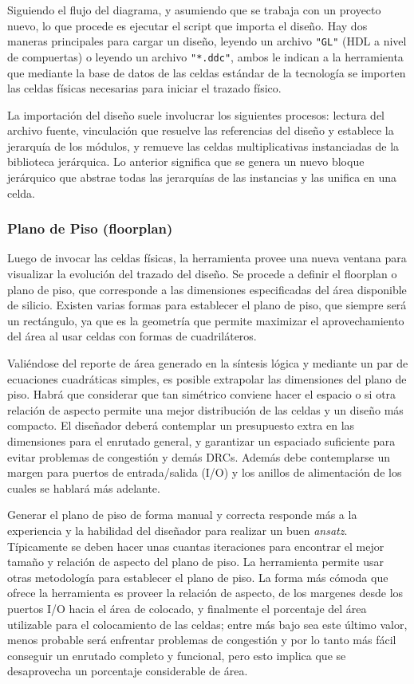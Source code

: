 Siguiendo el flujo del diagrama, y asumiendo que se trabaja con un proyecto nuevo, lo que procede es ejecutar el script que importa el diseño. Hay dos maneras principales para cargar un diseño, leyendo un archivo \texttt{"GL"} (HDL a nivel de compuertas) o leyendo un archivo \texttt{"*.ddc"}, ambos le indican a la herramienta que mediante la base de datos de las celdas estándar de la tecnología se importen las celdas físicas necesarias para iniciar el trazado físico.

La importación del diseño suele involucrar los siguientes procesos: lectura del archivo fuente, vinculación que resuelve las referencias del diseño y establece la jerarquía de los módulos, y remueve las celdas multiplicativas instanciadas de la biblioteca jerárquica. Lo anterior significa que se genera un nuevo bloque jerárquico que abstrae todas las jerarquías de las instancias y las unifica en una celda.

\subsubsection{Plano de Piso (floorplan)}

Luego de invocar las celdas físicas, la herramienta provee una nueva ventana para visualizar la evolución del trazado del diseño. Se procede a definir el floorplan o plano de piso, que corresponde a las dimensiones especificadas del área disponible de silicio. Existen varias formas para establecer el plano de piso, que siempre será un rectángulo, ya que es la geometría que permite maximizar el aprovechamiento del área al usar celdas con formas de cuadriláteros.

Valiéndose del reporte de área generado en la síntesis lógica y mediante un par de ecuaciones cuadráticas simples, es posible extrapolar las dimensiones del plano de piso. Habrá que considerar que tan simétrico conviene hacer el espacio o si otra relación de aspecto permite una mejor distribución de las celdas y un diseño más compacto. El diseñador deberá contemplar un presupuesto extra en las dimensiones para el enrutado general, y garantizar un espaciado suficiente para evitar problemas de congestión y demás DRCs. Además debe contemplarse un margen para puertos de entrada/salida (I/O) y los anillos de alimentación de los cuales se hablará más adelante.

Generar el plano de piso de forma manual y correcta responde más a la experiencia y la habilidad del diseñador para realizar un buen \textit{ansatz}. Típicamente se deben hacer unas cuantas iteraciones para encontrar el mejor tamaño y relación de aspecto del plano de piso. La herramienta permite usar otras metodología para establecer el plano de piso. La forma más cómoda que ofrece la herramienta es proveer la relación de aspecto, de los margenes desde los puertos I/O hacia el área de colocado, y finalmente el porcentaje del área utilizable para el colocamiento de las celdas; entre más bajo sea este último valor, menos probable será enfrentar problemas de congestión y por lo tanto más fácil conseguir un enrutado completo y funcional, pero esto implica que se desaprovecha un porcentaje considerable de área.

